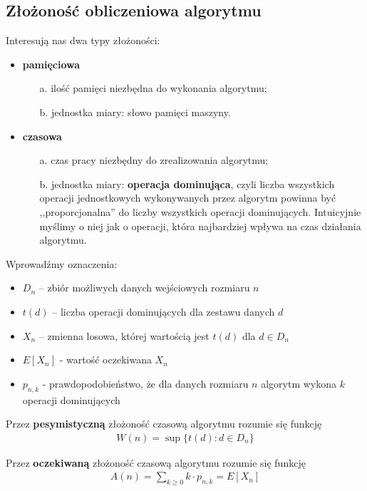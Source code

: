 \subsection{Złożoność obliczeniowa algorytmu}
Interesują nas dwa typy złożoności:
\begin{itemize}
    \item \textbf{pamięciowa}
    \begin{enumerate}
        \item[a.] ilość pamięci niezbędna do wykonania algorytmu;
        \item[b.] jednostka miary: słowo pamięci maszyny.
    \end{enumerate}
    \item \textbf{czasowa}
    \begin{enumerate}
        \item[a.] czas pracy niezbędny do zrealizowania algorytmu;
        \item[b.] jednostka miary: \textbf{operacja dominująca}, czyli liczba wszystkich operacji jednostkowych wykonywanych przez algorytm powinna być ,,proporcjonalna'' do liczby wszystkich operacji dominujących. Intuicyjnie myślimy o niej jak o operacji, która najbardziej wpływa na czas działania algorytmu. 
    \end{enumerate}
\end{itemize}

Wprowadźmy oznaczenia:
\begin{itemize}
    \item $D_n$ – zbiór możliwych danych wejściowych rozmiaru $n$
    \item $t(d)$ – liczba operacji dominujących dla zestawu danych $d$
    \item $X_n$ – zmienna losowa, której wartością jest $t(d)$ dla $d \in D_n$
    \item $E[X_n]$ - wartość oczekiwana $X_n$
    \item $p_{n,k}$ - prawdopodobieństwo, że dla danych rozmiaru $n$ algorytm wykona $k$ operacji dominujących
\end{itemize}

Przez \textbf{pesymistyczną} złożoność czasową algorytmu rozumie się funkcję
\begin{align*}
    W(n) = \sup \{t(d): d \in D_n\}
\end{align*}

Przez \textbf{oczekiwaną} złożoność czasową algorytmu rozumie się funkcję
\begin{align*}
    A(n) = \sum_{k \geq 0} k \cdot p_{n, k} = E[X_n]
\end{align*}

